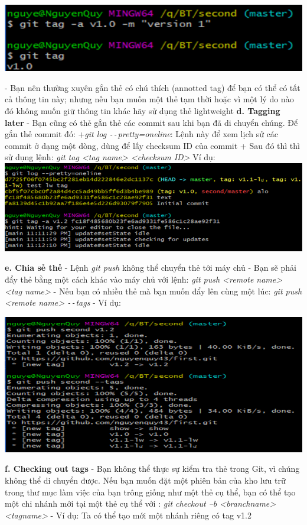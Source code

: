 \documentclass[12pt,a4paper]{report}
\begin{document}
	\includegraphics[width=0.8\linewidth]{screenshot043}

	\label{fig:screenshot043}\vskip 0.4cm\vskip 0.4cm

- Bạn nên thường xuyên gắn thẻ có chú thích (annotted tag) để bạn có thể có tất cả thông tin này; nhưng nếu bạn muốn một thẻ tạm thời hoặc vì một lý do nào đó không muốn giữ thông tin khác hãy sử dụng thẻ lightweight\vskip 0.4cm
{\bf d. Tagging later} \vskip 0.4cm
- Bạn cũng có thẻ gắn thẻ các commit sau khi bạn đã di chuyển chúng. Để gắn thẻ commit đó: \vskip 0.4cm
+{\it git log \texttt{-{}-}pretty=oneline}: Lệnh này để xem lịch sử các commit ở dạng một dòng, dùng để lấy checksum ID của commit\vskip 0.4cm
+ Sau đó thì thì sử dụng lệnh: {\it git tag <tag name> <checksum ID>}\vskip 0.4cm
Ví dụ: 
\vskip 0.4cm
	\includegraphics[width=0.8\linewidth]{screenshot044}

	\label{fig:screenshot044}
\vskip 0.4cm\vskip 0.4cm
{\bf e. Chia sẻ thẻ} \vskip 0.4cm
- Lệnh \textit{git push} không thể chuyển thẻ tới máy chủ\vskip 0.4cm
- Bạn sẽ phải đẩy thẻ bằng một cách khác vào máy chủ với lệnh: {\it git push <remote name> <tag name>}\vskip 0.4cm
- Nếu bạn có nhiều thẻ mà bạn muốn đẩy lên cùng một lúc: {\it git push <remote name> \texttt{-{}-}tags}\vskip 0.4cm
- Ví dụ:\vskip 0.4cm

	\includegraphics[width=0.8\linewidth]{screenshot045}

	\label{fig:screenshot045}
\vskip 0.4cm\vskip 0.4cm
{\bf f. Checking out tags} \vskip 0.4cm
- Bạn không thể thực sự kiểm tra thẻ trong Git, vì chúng không thể di chuyển được. Nếu bạn muốn đặt một phiên bản của kho lưu trữ trong thư mục làm việc của bạn trông giống như một thẻ cụ thể, bạn có thể tạo một chi nhánh mới tại một thẻ cụ thể với : {\it git checkout –b <branchname> <tagname>}\vskip 0.4cm
- Ví dụ: Ta có thể tạo mới một nhánh riêng có tag v1.2\vskip 0.4cm
\end{document}
